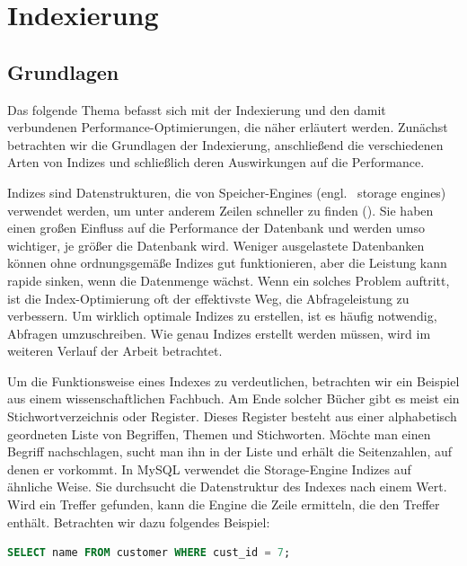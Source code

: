 
\chapter{Indexierung}\label{ch:indexing}

\section{Grundlagen}\label{sec:indexing-grundlagen}

Das folgende Thema befasst sich mit der Indexierung und den damit verbundenen Performance-Optimierungen, die näher erläutert werden.
Zunächst betrachten wir die Grundlagen der Indexierung, anschließend die verschiedenen Arten von Indizes und schließlich deren Auswirkungen auf die Performance.

Indizes sind Datenstrukturen, die von Speicher-Engines (engl. \ storage engines) verwendet werden, um unter anderem Zeilen schneller zu finden (\cite[pp. 147--189]{schwartz2012high}).
Sie haben einen großen Einfluss auf die Performance der Datenbank und werden umso wichtiger, je größer die Datenbank wird.
Weniger ausgelastete Datenbanken können ohne ordnungsgemäße Indizes gut funktionieren, aber die Leistung kann rapide sinken, wenn die Datenmenge wächst.
Wenn ein solches Problem auftritt, ist die Index-Optimierung oft der effektivste Weg, die Abfrageleistung zu verbessern.
Um wirklich optimale Indizes zu erstellen, ist es häufig notwendig, Abfragen umzuschreiben.
Wie genau Indizes erstellt werden müssen, wird im weiteren Verlauf der Arbeit betrachtet.

Um die Funktionsweise eines Indexes zu verdeutlichen, betrachten wir ein Beispiel aus einem wissenschaftlichen Fachbuch.
Am Ende solcher Bücher gibt es meist ein Stichwortverzeichnis oder Register.
Dieses Register besteht aus einer alphabetisch geordneten Liste von Begriffen, Themen und Stichworten.
Möchte man einen Begriff nachschlagen, sucht man ihn in der Liste und erhält die Seitenzahlen, auf denen er vorkommt.
In MySQL verwendet die Storage-Engine Indizes auf ähnliche Weise.
Sie durchsucht die Datenstruktur des Indexes nach einem Wert.
Wird ein Treffer gefunden, kann die Engine die Zeile ermitteln, die den Treffer enthält.
Betrachten wir dazu folgendes Beispiel:

\begin{lstlisting}[language=SQL,caption=Variationen,label={lst:select-query-customer}]
SELECT name FROM customer WHERE cust_id = 7;
\end{lstlisting}

